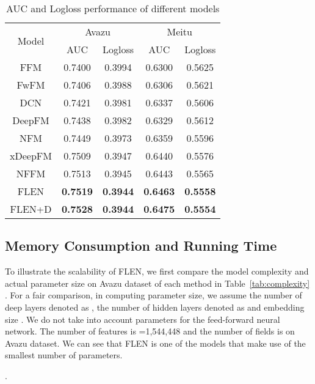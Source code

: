\documentclass[sigconf]{acmart}
\begin{document}
\begin{table}[!htbp]
\centering\caption{AUC and Logloss performance of different models}
\begin{tabular}{|c|c|c|c|c|} \hline
\multirow{2}{*}{Model} & \multicolumn{2}{|c|}{Avazu} & \multicolumn{2}{|c|}{Meitu} \\ \cline{2-5}
& AUC & Logloss & AUC & Logloss \\ \hline
FFM  & 0.7400 & 0.3994 & 0.6300 & 0.5625 \\
FwFM  & 0.7406 & 0.3988 & 0.6306 & 0.5621 \\
DCN  & 0.7421 & 0.3981 & 0.6337 & 0.5606 \\
DeepFM  & 0.7438 & 0.3982 & 0.6329 & 0.5612 \\
NFM  & 0.7449 & 0.3973 & 0.6359 & 0.5596 \\
xDeepFM & 0.7509 & 0.3947 & 0.6440 & 0.5576 \\
NFFM & 0.7513 & 0.3945 & 0.6443 & 0.5565 \\
FLEN  & \textbf{0.7519} & \textbf{0.3944} & \textbf{0.6463} & \textbf{0.5558}\\ 
FLEN+D & \textbf{0.7528} & \textbf{0.3944} & \textbf{0.6475} & \textbf{0.5554}\\\hline
\end{tabular}
\label{tab:results}
\end{table}


\subsection{Memory Consumption and Running Time}

To illustrate the scalability of FLEN, we first compare the model complexity and actual parameter size on Avazu dataset of each method in Table~\ref{tab:complexity} . 
For a fair comparison, in computing parameter size, we assume the number of deep layers denoted as , the number of hidden layers denoted as  and embedding size . We do not take into account parameters for the feed-forward neural network. 
The number of features is =1,544,448 and the number of fields is  on Avazu dataset.
We can see that FLEN is one of the models that make use of the smallest number of parameters. 



\begin{table}[!htbp]
\centering\caption{Model complexity and parameter size in Avazu dataset for different models}. 
\end{table}
\end{document}
